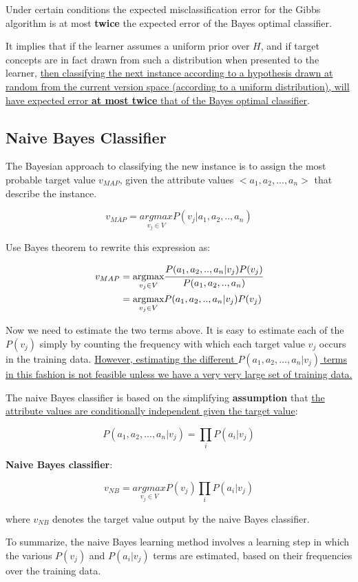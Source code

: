 Under certain conditions the expected misclassification error for the
Gibbs algorithm is at most \textbf{twice} the expected error of the
Bayes optimal classifier.

It implies that if the learner assumes a uniform prior over \(H\), and
if target concepts are in fact drawn from such a distribution when
presented to the learner, \underline{then classifying the next instance
according to a hypothesis drawn at random from the current version space
(according to a uniform distribution), will have expected error
\textbf{at most twice} that of the Bayes optimal classifier}.

\hypertarget{naive-bayes-classifier}{%
\subsection{Naive Bayes Classifier}\label{naive-bayes-classifier}}

The Bayesian approach to classifying the new instance is to assign the
most probable target value \(v_{MAP}\), given the attribute values
\(<a_1,a_2,...,a_n>\) that describe the instance.

\[v_{MAP}=\underset{v_j\in V}{argmax}P(v_j|a_1,a_2,..,a_n)\]

Use Bayes theorem to rewrite this expression as:

\begin{equation*}
\begin{aligned}
v_{MAP}&=\underset{v_j\in V}{\text{argmax}}\cfrac{P(a_1,a_2,..,a_n|v_j)P(v_j)}{P(a_1,a_2,..,a_n)}\\
&=\underset{v_j\in V}{\text{argmax}}P(a_1,a_2,..,a_n|v_j)P(v_j)
\end{aligned}
\end{equation*}

Now we need to estimate the two terms above. It is easy to estimate each
of the \(P(v_j)\) simply by counting the frequency with which each
target value \(v_j\) occurs in the training data. \underline{However,
estimating the different \(P(a_1,a_2,...,a_n|v_j)\) terms in this
fashion is not feasible unless we have a very very large set of training
data.}

The naive Bayes classifier is based on the simplifying
\textbf{assumption} that \underline{the attribute values are conditionally
independent given the target value}:

\[P(a_1,a_2,...,a_n|v_j)=\prod_i P(a_i|v_j)\]

\textbf{Naive Bayes classifier}:

\[v_{NB}=\underset{v_j\in V}{argmax}P(v_j)\prod_i P(a_i|v_j)\]

where \(v_{NB}\) denotes the target value output by the naive Bayes
classifier.

To summarize, the naive Bayes learning method involves a learning step
in which the various \(P(v_j)\) and \(P(a_i|v_j)\) terms are estimated,
based on their frequencies over the training data.

